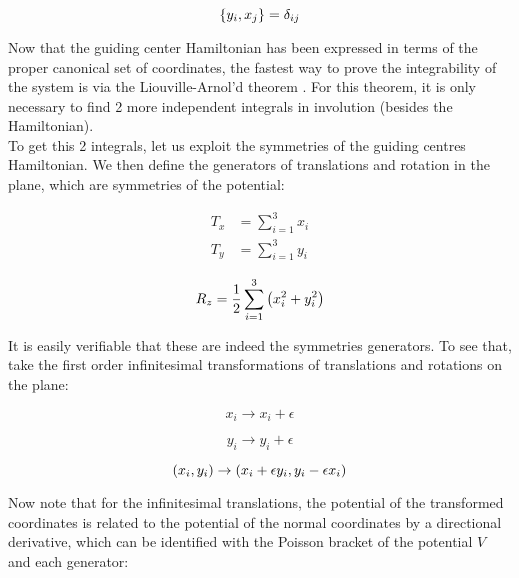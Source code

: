 \begin{equation}
\left\lbrace y_i, x_j \right\rbrace = \delta_{ij}
\label{lastpb}
\end{equation}

Now that the guiding center Hamiltonian has been expressed in terms of the proper canonical set of coordinates, the fastest way to prove the integrability of the system is via the Liouville-Arnol'd theorem \cite[Sect. 49]{arnold}. For this theorem, it is only necessary to find 2 more independent integrals in involution (besides the Hamiltonian).\\

To get this 2 integrals, let us exploit the symmetries of the guiding centres Hamiltonian. We then define the generators of translations and rotation in the plane, which are symmetries of the potential:

\begin{equation}
\begin{aligned}
T_x &= \sum_{i=1}^{3} x_i \\
T_y &= \sum_{i=1}^{3} y_i 
\end{aligned}
\label{eq:gentranslation}
\end{equation}


\begin{equation}
R_z = \frac{1}{2} \sum_{i=1}^{3} \left( x_i^2 + y_i^2 \right)
\label{eq:genrotation}
\end{equation}

It is easily verifiable that these are indeed the symmetries generators. To see that, take the first order infinitesimal transformations of translations and rotations on the plane:

\begin{equation*}
x_i  \rightarrow x_i + \epsilon 
\end{equation*}

\begin{equation*}
y_i \rightarrow y_i + \epsilon 
\end{equation*}

\begin{equation*}
\left( x_i,y_i \right) \rightarrow \left( x_i +\epsilon y_i, y_i - \epsilon x_i \right)
\end{equation*}

Now note that for the infinitesimal translations, the potential of the transformed coordinates is related to the potential of the normal coordinates by a directional derivative, which can be identified with the Poisson bracket of the potential $V$ and each generator:

